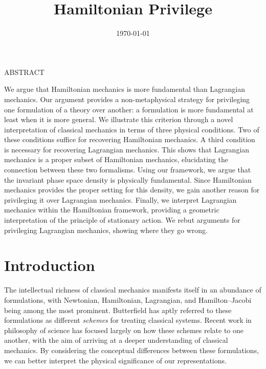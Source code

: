 \documentclass[12pt, english, twoside]{article} %
\renewenvironment{abstract}
 {\small
  \begin{center}
\normalsize  \textnormal{ABSTRACT\\} \vspace{-0em}\vspace{0pt}
  \end{center}
  \list{}{%
    \setlength{\leftmargin}{0in}%
    \setlength{\rightmargin}{\leftmargin}%
  }%
  \item\relax}
 {\endlist}
\newcommand\bs{\begin{singlespace}}
\newcommand\es{\end{singlespace}}
\begin{document}
\title{\vspace{-2em} Hamiltonian Privilege}

\date{\vspace{-3em} \today}

\maketitle

\vspace{-3em}
\bs
\begin{abstract}
\noindent We argue that Hamiltonian mechanics is more fundamental than Lagrangian mechanics. Our argument provides a non-metaphysical strategy for privileging one formulation of a theory over another: a formulation is more fundamental at least when it is more general. We illustrate this criterion through a novel interpretation of classical mechanics in terms of three physical conditions. Two of these conditions suffice for recovering Hamiltonian mechanics. A third condition is necessary for recovering Lagrangian mechanics. This shows that Lagrangian mechanics is a proper subset of Hamiltonian mechanics, elucidating the connection between these two formalisms. Using our framework, we argue that the invariant phase space density is physically fundamental. Since Hamiltonian mechanics provides the proper setting for this density, we gain another reason for privileging it over Lagrangian mechanics. Finally, we interpret Lagrangian mechanics within the Hamiltonian framework, providing a geometric interpretation of the principle of stationary action. We rebut arguments for privileging Lagrangian mechanics, showing where they go wrong. 
\end{abstract}
\es

\bs
\tableofcontents 
\es

\section{Introduction}
\label{introduction}


The intellectual richness of classical mechanics manifests itself in an abundance of formulations, with Newtonian, Hamiltonian, Lagrangian, and Hamilton--Jacobi being among the most prominent.  Butterfield \parencites*[]{Butterfield2004} has aptly referred to these formulations as different \textit{schemes} for treating classical systems. Recent work in philosophy of science has focused largely on how these schemes relate to one another, with the aim of arriving at a deeper understanding of classical mechanics. By considering the conceptual differences between these formulations, we can better interpret the physical significance of our representations.
\end{document}
